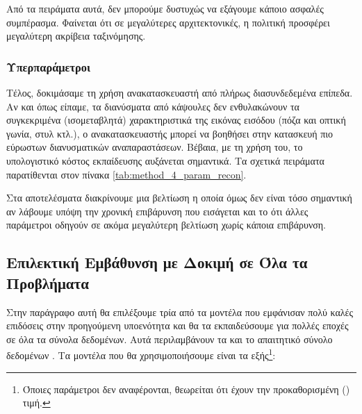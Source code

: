 Από τα πειράματα αυτά, δεν μπορούμε δυστυχώς να εξάγουμε κάποιο ασφαλές συμπέρασμα. Φαίνεται ότι σε μεγαλύτερες αρχιτεκτονικές, η πολιτική  προσφέρει μεγαλύτερη ακρίβεια ταξινόμησης.

\subsubsection{Υπερπαράμετροι }

Τέλος, δοκιμάσαμε τη χρήση ανακατασκευαστή από πλήρως διασυνδεδεμένα επίπεδα. Αν και όπως είπαμε, τα διανύσματα από κάψουλες δεν ενθυλακώνουν τα συγκεκριμένα (ισομεταβλητά) χαρακτηριστικά της εικόνας εισόδου (πόζα και οπτική γωνία, στυλ κτλ.), ο ανακατασκευαστής μπορεί να βοηθήσει στην κατασκευή πιο εύρωστων διανυσματικών αναπαραστάσεων. Βέβαια, με τη χρήση του, το υπολογιστικό κόστος εκπαίδευσης αυξάνεται σημαντικά. Τα σχετικά πειράματα παρατίθενται στον πίνακα \ref{tab:method_4_param_recon}.


\begin{table}[h]
    \begin{center}
    \end{center}
    \caption[]{\label{tab:method_4_param_recon}Επίδραση της παραμέτρου  της μεθόδου 4 στην επίδοση στο σύνολο δεδομένων ελέγχου . Τα πειράματα αυτά πραγματοποιήθηκαν για 10 εποχές με μέγεθος δέσμης ίσο με 8.} 
\end{table}

Στα αποτελέσματα διακρίνουμε μια βελτίωση η οποία όμως δεν είναι τόσο σημαντική αν λάβουμε υπόψη την χρονική επιβάρυνση που εισάγεται και το ότι άλλες παράμετροι οδηγούν σε ακόμα μεγαλύτερη βελτίωση χωρίς κάποια επιβάρυνση.

\subsection{Επιλεκτική Εμβάθυνση με Δοκιμή σε Όλα τα Προβλήματα}
Στην παράγραφο αυτή θα επιλέξουμε τρία από τα μοντέλα που εμφάνισαν πολύ καλές επιδόσεις στην προηγούμενη υποενότητα και θα τα εκπαιδεύσουμε για πολλές εποχές σε όλα τα σύνολα δεδομένων. Αυτά περιλαμβάνουν τα  και το απαιτητικό σύνολο δεδομένων . Τα μοντέλα που θα χρησιμοποιήσουμε είναι τα εξής\footnote{Όποιες παράμετροι δεν αναφέρονται, θεωρείται ότι έχουν την προκαθορισμένη () τιμή.}:

